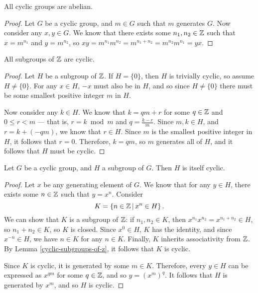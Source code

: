 \begin{prop}
    All cyclic groups are abelian.
\end{prop}

\begin{proof}
    Let $G$ be a cyclic group, and $m \in G$ such that $m$ generates $G$. Now consider any $x, y \in G$. We know that there exists some $n_1, n_2 \in \mathbb{Z}$ such that $x = m^{n_1}$ and $y = m^{n_2}$, so $xy = m^{n_1}m^{n_2} = m^{n_1 + n_2} = m^{n_2}m^{n_1} = yx$.
\end{proof}

\begin{lemma}\label{cyclic-subgroups-of-z}
    All subgroups of $\mathbb{Z}$ are cyclic.
\end{lemma}

\begin{proof}
    Let $H$ be a subgroup of $\mathbb{Z}$. If $H = \{0\}$, then $H$ is trivially cyclic, so assume $H \neq \{0\}$. For any $x \in H$, $-x$ must also be in $H$, and so since $H \neq \{0\}$ there must be some smallest positive integer $m$ in $H$.

    Now consider any $k \in H$. We know that $k = qm + r$ for some $q \in \mathbb{Z}$ and $0 \leq r < m$ --- that is, $r = k \bmod m$ and $q = \frac{k - r}{m}$. Since $m, k \in H$, and $r = k + (-qm)$, we know that $r \in H$. Since $m$ is the smallest positive integer in $H$, it follows that $r = 0$. Therefore, $k = qm$, so $m$ generates all of $H$, and it follows that $H$ must be cyclic.
\end{proof}

\begin{thm}
    Let $G$ be a cyclic group, and $H$ a subgroup of $G$. Then $H$ is itself cyclic.
\end{thm}

\begin{proof}
    Let $x$ be any generating element of $G$. We know that for any $y \in H$, there exists some $n \in \mathbb{Z}$ such that $y = x^n$. Consider \[K = \left\{n \in \mathbb{Z} \,\middle|\, x^n \in H\right\}.\] We can show that $K$ is a subgroup of $\mathbb{Z}$: if $n_1, n_2 \in K$, then $x^{n_1}x^{n_2} = x^{n_1 + n_2} \in H$, so $n_1 + n_2 \in K$, so $K$ is closed. Since $x^0 \in H$, $K$ has the identity, and since $x^{-n} \in H$, we have $n \in K$ for any $n \in K$. Finally, $K$ inherits associativity from $\mathbb{Z}$. By Lemma \ref{cyclic-subgroups-of-z}, it follows that $K$ is cyclic.

    Since $K$ is cyclic, it is generated by some $m \in K$. Therefore, every $y \in H$ can be expressed as $x^{qm}$ for some $q \in \mathbb{Z}$, and so $y = (x^m)^q$. It follows that $H$ is generated by $x^m$, and so $H$ is cyclic.
\end{proof}

